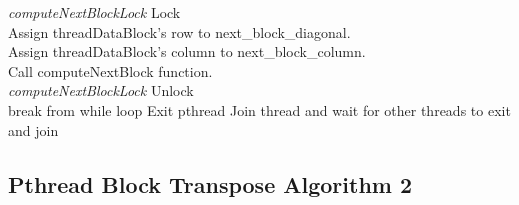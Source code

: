\documentclass[10pt, onecolumn]{article}
\begin{document}
\begin{algorithm}[H]
{{            \emph{computeNextBlockLock} Lock\\
            Assign threadDataBlock's row to next\_block\_diagonal.\\
            Assign threadDataBlock's column to next\_block\_column.\\
            Call computeNextBlock function.\\
            \emph{computeNextBlockLock} Unlock\\
            
            { break from while loop}
        }
        Exit pthread
    }
    {
        Join thread and wait for other threads to exit and join
    }
\end{algorithm}
%
\subsection{Pthread Block Transpose Algorithm 2}
%
\end{document}
